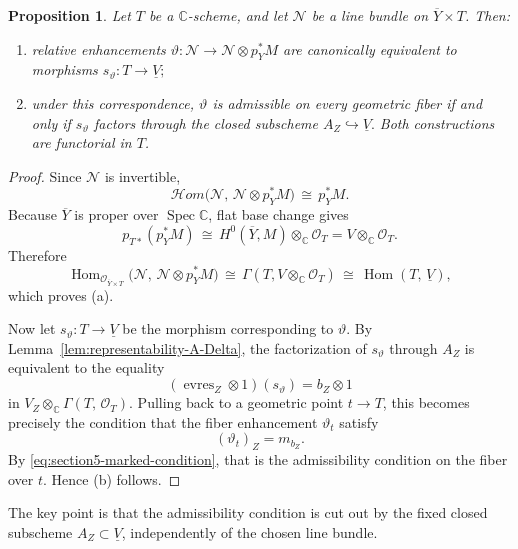 \documentclass[a4paper,12pt]{amsart}
\numberwithin{equation}{section}
\newtheorem{proposition}[theorem]{Proposition}
\theoremstyle{definition}
\newcommand{\OO}{\mathcal{O}}
\newcommand{\Hom}{\operatorname{Hom}}
\newcommand{\Spec}{\operatorname{Spec}}
\newcommand{\sheafHom}{\mathcal{H}om}
\newcommand{\evres}{\operatorname{evres}}
\newcommand{\CC}{\mathbb C}
\begin{document}
\begin{proposition}\label{prop:family-enhancement}
Let \(T\) be a \(\CC\)-scheme, and let \(\mathcal N\) be a line bundle on \(\overline{Y}\times T\).  Then:
\begin{enumerate}
\item[(a)] relative enhancements
\(
\vartheta:\mathcal N\longrightarrow \mathcal N\otimes p_Y^*M
\)
are canonically equivalent to morphisms
\(
s_\vartheta:T\longrightarrow \underline{V};
\)
\item[(b)] under this correspondence, \(\vartheta\) is admissible on every geometric fiber if and only if \(s_\vartheta\) factors through the closed subscheme
\(
A_Z\hookrightarrow \underline{V}.
\)
Both constructions are functorial in \(T\).
\end{enumerate}
\end{proposition}
\begin{proof}
Since \(\mathcal N\) is invertible,
\[
\sheafHom\!\bigl(\mathcal N,\,\mathcal N\otimes p_Y^*M\bigr)\,\cong\, p_Y^*M.
\]
Because \(\overline{Y}\) is proper over \(\Spec\CC\), flat base change gives
\[
p_{T*}(p_Y^*M)\,\cong\, H^0(\overline{Y},M)\otimes_\CC \OO_T=V\otimes_\CC \OO_T.
\]
Therefore
\[
\Hom_{\OO_{\overline{Y}\times T}}\!\bigl(\mathcal N,\,\mathcal N\otimes p_Y^*M\bigr)
\,\cong\,
\Gamma(T,V\otimes_\CC \OO_T)
\,\cong\,
\Hom(T,\,\underline{V}),
\]
which proves \textup{(a)}.

Now let \(s_\vartheta:T\longrightarrow \underline{V}\) be the morphism corresponding to \(\vartheta\).  By Lemma~\ref{lem:representability-A-Delta}, the factorization of \(s_\vartheta\) through \(A_Z\) is equivalent to the equality
\[
(\evres_Z\otimes 1)(s_\vartheta)=b_Z\otimes 1
\]
in \(V_Z\otimes_\CC \Gamma(T,\,\OO_T)\).  Pulling back to a geometric point \(t\longrightarrow T\), this becomes precisely the condition that the fiber enhancement \(\vartheta_t\) satisfy
\[
(\vartheta_t)_Z=m_{b_Z}.
\]
By \eqref{eq:section5-marked-condition}, that is the admissibility condition on the fiber over \(t\).  Hence \textup{(b)} follows.
\end{proof}

The key point is that the admissibility condition is cut out by the fixed closed subscheme \(A_Z\subset \underline{V}\), independently of the chosen line bundle.
\end{document}
